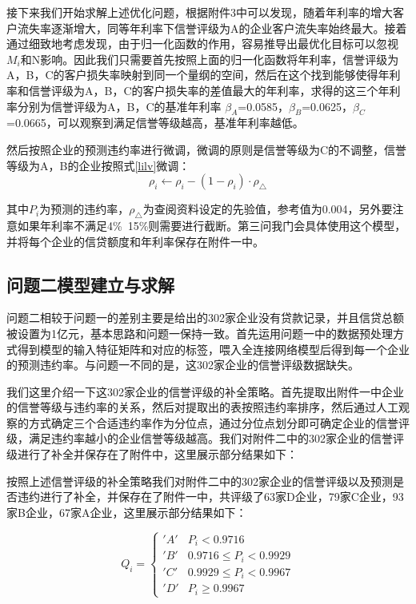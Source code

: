 \documentclass{cumcmthesis}
\begin{document}
接下来我们开始求解上述优化问题，根据附件3中可以发现，随着年利率的增大客户流失率逐渐增大，同等年利率下信誉评级为A的企业客户流失率始终最大。接着通过细致地考虑发现，由于归一化函数的作用，容易推导出最优化目标可以忽视$M_i$和N影响。因此我们只需要首先按照上面的归一化函数将年利率，信誉评级为A，B，C的客户损失率映射到同一个量纲的空间，然后在这个找到能够使得年利率和信誉评级为A，B，C的客户损失率的差值最大的年利率，求得的这三个年利率分别为信誉评级为A，B，C的基准年利率
$\beta_A$=0.0585，$\beta_B$=0.0625，$\beta_C$=0.0665，可以观察到满足信誉等级越高，基准年利率越低。

然后按照企业的预测违约率进行微调，微调的原则是信誉等级为C的不调整，信誉等级为A，B的企业按照式\ref{lilv}微调：
\begin{equation}
    \rho_i \gets \rho_i - (1 - \rho_i) \cdot \rho_\triangle
    \label{lilv}
\end{equation}

其中$P_i$为预测的违约率，$\rho_\triangle$为查阅资料设定的先验值，参考值为0.004，另外要注意如果年利率不满足4\%~15\%则需要进行截断。第三问我门会具体使用这个模型，并将每个企业的信贷额度和年利率保存在附件一中。

\subsection{问题二模型建立与求解}
问题二相较于问题一的差别主要是给出的302家企业没有贷款记录，并且信贷总额被设置为1亿元，基本思路和问题一保持一致。首先运用问题一中的数据预处理方式得到模型的输入特征矩阵和对应的标签，喂入全连接网络模型后得到每一个企业的预测违约率。与问题一不同的是，这302家企业的信誉评级数据缺失。

我们这里介绍一下这302家企业的信誉评级的补全策略。首先提取出附件一中企业的信誉等级与违约率的关系，然后对提取出的表按照违约率排序，然后通过人工观察的方式确定三个合适违约率作为分位点，通过分位点划分即可确定企业的信誉评级，满足违约率越小的企业信誉等级越高。我们对附件二中的302家企业的信誉评级进行了补全并保存在了附件中，这里展示部分结果如下：

按照上述信誉评级的补全策略我们对附件二中的302家企业的信誉评级以及预测是否违约进行了补全，并保存在了附件一中，共评级了63家D企业，79家C企业，93家B企业，67家A企业，这里展示部分结果如下：

\begin{equation}
    Q_i = 
    \begin{cases}
        'A' & P_i < 0.9716 \\
        'B' & 0.9716 \leq P_i < 0.9929 \\
        'C' & 0.9929 \leq P_i < 0.9967 \\
        'D' & P_i \geq 0.9967
    \end{cases}
\end{equation}
\end{document}
